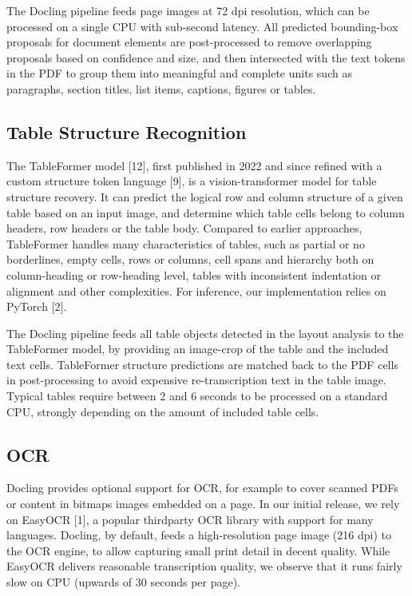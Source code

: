The Docling pipeline feeds page images at 72 dpi resolution, which can be processed on a single CPU with sub-second latency. All predicted bounding-box proposals for document elements are post-processed to remove overlapping proposals based on confidence and size, and then intersected with the text tokens in the PDF to group them into meaningful and complete units such as paragraphs, section titles, list items, captions, figures or tables.

\subsection{Table Structure Recognition}

The TableFormer model [12], first published in 2022 and since refined with a custom structure token language [9], is a vision-transformer model for table structure recovery. It can predict the logical row and column structure of a given table based on an input image, and determine which table cells belong to column headers, row headers or the table body. Compared to earlier approaches, TableFormer handles many characteristics of tables, such as partial or no borderlines, empty cells, rows or columns, cell spans and hierarchy both on column-heading or row-heading level, tables with inconsistent indentation or alignment and other complexities. For inference, our implementation relies on PyTorch [2].

The Docling pipeline feeds all table objects detected in the layout analysis to the TableFormer model, by providing an image-crop of the table and the included text cells. TableFormer structure predictions are matched back to the PDF cells in post-processing to avoid expensive re-transcription text in the table image. Typical tables require between 2 and 6 seconds to be processed on a standard CPU, strongly depending on the amount of included table cells.

\subsection{OCR}

Docling provides optional support for OCR, for example to cover scanned PDFs or content in bitmaps images embedded on a page. In our initial release, we rely on EasyOCR [1], a popular thirdparty OCR library with support for many languages. Docling, by default, feeds a high-resolution page image (216 dpi) to the OCR engine, to allow capturing small print detail in decent quality. While EasyOCR delivers reasonable transcription quality, we observe that it runs fairly slow on CPU (upwards of 30 seconds per page).

